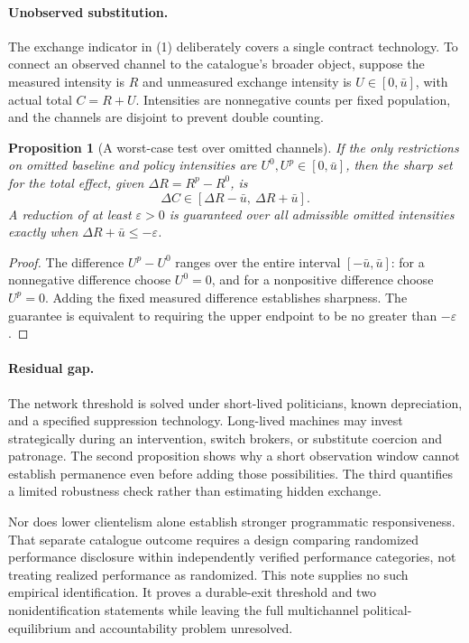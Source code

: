 \documentclass[11pt]{article}
\newtheorem{proposition}[theorem]{Proposition}
\theoremstyle{definition}
\begin{document}
\paragraph{Unobserved substitution.}
The exchange indicator in (1) deliberately covers a single contract technology. To connect an observed channel to the catalogue's broader object, suppose the measured intensity is $R$ and unmeasured exchange intensity is $U\in[0,\bar u]$, with actual total $C=R+U$. Intensities are nonnegative counts per fixed population, and the channels are disjoint to prevent double counting.

\begin{proposition}[A worst-case test over omitted channels]
If the only restrictions on omitted baseline and policy intensities are $U^0,U^p\in[0,\bar u]$, then the sharp set for the total effect, given $\Delta R=R^p-R^0$, is
\[
 \Delta C\in[\Delta R-\bar u,\ \Delta R+\bar u].
\]
A reduction of at least $\varepsilon>0$ is guaranteed over all admissible omitted intensities exactly when $\Delta R+\bar u\leq-\varepsilon$.
\end{proposition}
\begin{proof}
The difference $U^p-U^0$ ranges over the entire interval $[-\bar u,\bar u]$: for a nonnegative difference choose $U^0=0$, and for a nonpositive difference choose $U^p=0$. Adding the fixed measured difference establishes sharpness. The guarantee is equivalent to requiring the upper endpoint to be no greater than $-\varepsilon$.
\end{proof}

\paragraph{Residual gap.}
The network threshold is solved under short-lived politicians, known depreciation, and a specified suppression technology. Long-lived machines may invest strategically during an intervention, switch brokers, or substitute coercion and patronage. The second proposition shows why a short observation window cannot establish permanence even before adding those possibilities. The third quantifies a limited robustness check rather than estimating hidden exchange.

Nor does lower clientelism alone establish stronger programmatic responsiveness. That separate catalogue outcome requires a design comparing randomized performance disclosure within independently verified performance categories, not treating realized performance as randomized. This note supplies no such empirical identification. It proves a durable-exit threshold and two nonidentification statements while leaving the full multichannel political-equilibrium and accountability problem unresolved.
\end{document}
